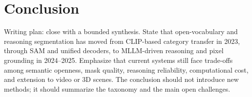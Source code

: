 \section{Conclusion}
\label{sec:conclusion}

Writing plan: close with a bounded synthesis. State that open-vocabulary and reasoning segmentation has moved from CLIP-based category transfer in 2023, through SAM and unified decoders, to MLLM-driven reasoning and pixel grounding in 2024--2025. Emphasize that current systems still face trade-offs among semantic openness, mask quality, reasoning reliability, computational cost, and extension to video or 3D scenes. The conclusion should not introduce new methods; it should summarize the taxonomy and the main open challenges.